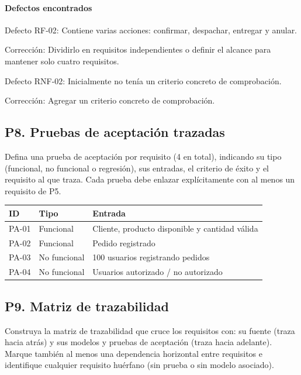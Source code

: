 \documentclass[11pt,a4paper]{article}
\begin{document}
\paragraph{Defectos encontrados}

Defecto RF-02: Contiene varias acciones: confirmar, despachar, entregar y anular.

Corrección: Dividirlo en requisitos independientes o definir el alcance para mantener solo
cuatro requisitos.

Defecto RNF-02: Inicialmente no tenía un criterio concreto de comprobación.

Corrección: Agregar un criterio concreto de comprobación.

\subsection*{P8. Pruebas de aceptación trazadas}

Defina una prueba de aceptación por requisito (4 en total), indicando su tipo (funcional, no
funcional o regresión), sus entradas, el criterio de éxito y el requisito al que traza. Cada
prueba debe enlazar explícitamente con al menos un requisito de P5.

\begin{center}
\begin{tabular}{|l|l|p{7cm}|}
\hline
\rowcolor{tablehead}
\textbf{ID} & \textbf{Tipo} & \textbf{Entrada} \\
\hline
PA-01 & Funcional    & Cliente, producto disponible y cantidad válida \\
\hline
PA-02 & Funcional    & Pedido registrado \\
\hline
PA-03 & No funcional & 100 usuarios registrando pedidos \\
\hline
PA-04 & No funcional & Usuarios autorizado / no autorizado \\
\hline
\end{tabular}
\end{center}

\subsection*{P9. Matriz de trazabilidad}

Construya la matriz de trazabilidad que cruce los requisitos con: su fuente (traza hacia atrás) y
sus modelos y pruebas de aceptación (traza hacia adelante). Marque también al menos una
dependencia horizontal entre requisitos e identifique cualquier requisito huérfano (sin prueba o
sin modelo asociado).
\end{document}
